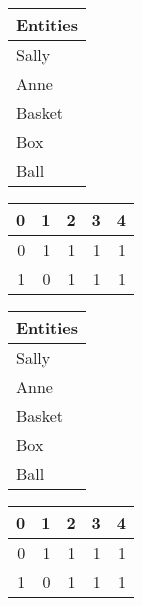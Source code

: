 \begin{tabular}{l}
\toprule
Entities \\
\midrule
   Sally \\
    Anne \\
  Basket \\
     Box \\
    Ball \\
\bottomrule
\end{tabular}

\begin{tabular}{rrrrr}
\toprule
 0 &  1 &  2 &  3 &  4 \\
\midrule
 0 &  1 &  1 &  1 &  1 \\
 1 &  0 &  1 &  1 &  1 \\
\bottomrule
\end{tabular}

\begin{tabular}{l}
\toprule
Entities \\
\midrule
   Sally \\
    Anne \\
  Basket \\
     Box \\
    Ball \\
\bottomrule
\end{tabular}

\begin{tabular}{rrrrr}
\toprule
 0 &  1 &  2 &  3 &  4 \\
\midrule
 0 &  1 &  1 &  1 &  1 \\
 1 &  0 &  1 &  1 &  1 \\
\bottomrule
\end{tabular}

